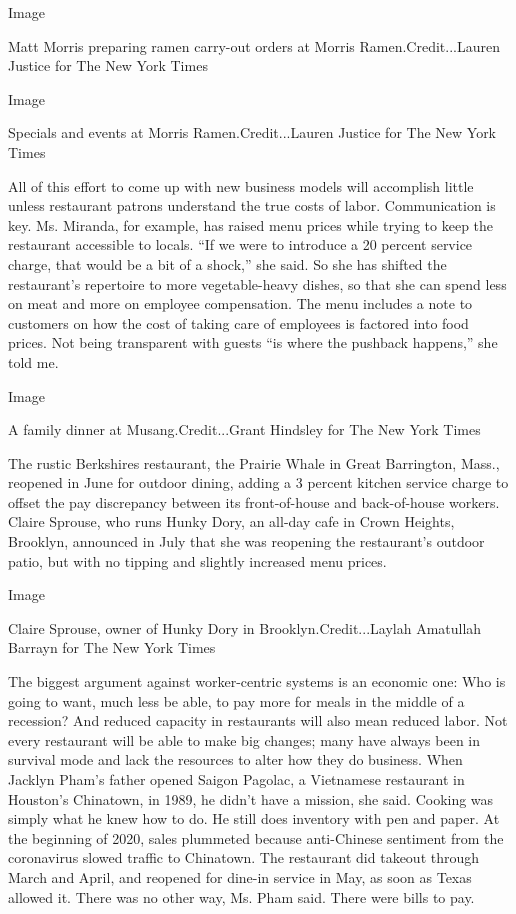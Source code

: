 Image

Matt Morris preparing ramen carry-out orders at Morris
Ramen.Credit...Lauren Justice for The New York Times

Image

Specials and events at Morris Ramen.Credit...Lauren Justice for The New
York Times

All of this effort to come up with new business models will accomplish
little unless restaurant patrons understand the true costs of labor.
Communication is key. Ms. Miranda, for example, has raised menu prices
while trying to keep the restaurant accessible to locals. ``If we were
to introduce a 20 percent service charge, that would be a bit of a
shock,'' she said. So she has shifted the restaurant's repertoire to
more vegetable-heavy dishes, so that she can spend less on meat and more
on employee compensation. The menu includes a note to customers on how
the cost of taking care of employees is factored into food prices. Not
being transparent with guests ``is where the pushback happens,'' she
told me.

Image

A family dinner at Musang.Credit...Grant Hindsley for The New York Times

The rustic Berkshires restaurant, the Prairie Whale in Great Barrington,
Mass., reopened in June for outdoor dining, adding a 3 percent kitchen
service charge to offset the pay discrepancy between its front-of-house
and back-of-house workers. Claire Sprouse, who runs Hunky Dory, an
all-day cafe in Crown Heights, Brooklyn, announced in July that she was
reopening the restaurant's outdoor patio, but with no tipping and
slightly increased menu prices.

Image

Claire Sprouse, owner of Hunky Dory in Brooklyn.Credit...Laylah
Amatullah Barrayn for The New York Times

The biggest argument against worker-centric systems is an economic one:
Who is going to want, much less be able, to pay more for meals in the
middle of a recession? And reduced capacity in restaurants will also
mean reduced labor. Not every restaurant will be able to make big
changes; many have always been in survival mode and lack the resources
to alter how they do business. When Jacklyn Pham's father opened Saigon
Pagolac, a Vietnamese restaurant in Houston's Chinatown, in 1989, he
didn't have a mission, she said. Cooking was simply what he knew how to
do. He still does inventory with pen and paper. At the beginning of
2020, sales plummeted because anti-Chinese sentiment from the
coronavirus slowed traffic to Chinatown. The restaurant did takeout
through March and April, and reopened for dine-in service in May, as
soon as Texas allowed it. There was no other way, Ms. Pham said. There
were bills to pay.

